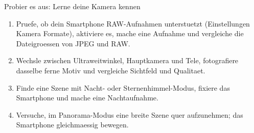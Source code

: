 \begin{tcbpractice}{Probier es aus: Lerne deine Kamera kennen}
\begin{enumerate}
  \item Pruefe, ob dein Smartphone RAW-Aufnahmen unterstuetzt (Einstellungen Kamera Formate), aktiviere es, mache eine Aufnahme und vergleiche die Dateigroessen von JPEG und RAW.
  \item Wechsle zwischen Ultraweitwinkel, Hauptkamera und Tele, fotografiere dasselbe ferne Motiv und vergleiche Sichtfeld und Qualitaet.
  \item Finde eine Szene mit Nacht- oder Sternenhimmel-Modus, fixiere das Smartphone und mache eine Nachtaufnahme.
  \item Versuche, im Panorama-Modus eine breite Szene quer aufzunehmen; das Smartphone gleichmaessig bewegen.
\end{enumerate}

\end{tcbpractice}
